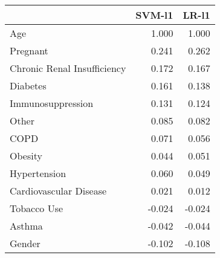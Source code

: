 \begin{tabular}{lrr}
\toprule
{} &  SVM-l1 &  LR-l1 \\
\midrule
Age                         &   1.000 &  1.000 \\
Pregnant                    &   0.241 &  0.262 \\
Chronic Renal Insufficiency &   0.172 &  0.167 \\
Diabetes                    &   0.161 &  0.138 \\
Immunosuppression           &   0.131 &  0.124 \\
Other                       &   0.085 &  0.082 \\
COPD                        &   0.071 &  0.056 \\
Obesity                     &   0.044 &  0.051 \\
Hypertension                &   0.060 &  0.049 \\
Cardiovascular Disease      &   0.021 &  0.012 \\
Tobacco Use                 &  -0.024 & -0.024 \\
Asthma                      &  -0.042 & -0.044 \\
Gender                      &  -0.102 & -0.108 \\
\bottomrule
\end{tabular}
